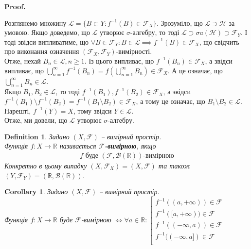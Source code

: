 \documentclass[a4paper, 10pt]{article}
\makeatletter
\theoremstyle{theoremdd}
\newtheorem{definition}[theorem]{Definition}
\newtheorem{corollary}[theorem]{Corollary}
\renewenvironment{proof}[1][Proof.\\]{\par
\pushQED{\hfill \qed}%
\normalfont \topsep6\p@\@plus6\p@\relax
\trivlist
\item\relax
{\bfseries
#1\@addpunct{.}}\hspace\labelsep\ignorespaces
}{%
\popQED\endtrivlist\@endpefalse
}
\makeatother
\begin{document}
\begin{proof}
Розглянемо множину $\mathcal{L} = \{ B \subset Y : f^{-1}(B) \in \mathcal{F}_X \}$. Зрозуміло, що $\mathcal{L} \supset \mathcal{H}$ за умовою. Якщо доведемо, що $\mathcal{L}$ утворює $\sigma$-алгебру, то тоді $\mathcal{L} \supset \sigma a(\mathcal{H}) \supset \mathcal{F}_Y$. І тоді звідси випливатиме, що $\forall B \in \mathcal{F}_Y: B \in \mathcal{L} \implies f^{-1}(B) \in \mathcal{F}_X$, що свідчить про виконання означення $(\mathcal{F}_X,\mathcal{F}_Y)$-вимірності.\\
Отже, нехай $B_n \in \mathcal{L}, n \geq 1$. Із цього випливає, що $f^{-1}(B_n) \in \mathcal{F}_X$, а звідси випливає, що $\displaystyle\bigcup_{n=1}^\infty f^{-1}(B_n) = f\left( \bigcup_{n=1}^\infty B_n \right) \in \mathcal{F}_X$. А це означає, що $\displaystyle\bigcup_{n=1}^\infty B_n \in \mathcal{L}$.\\
Якщо $B_1,B_2 \in \mathcal{L}$, то тоді $f^{-1}(B_1),f^{-1}(B_2) \in \mathcal{F}_X$, а звідси $f^{-1}(B_1) \setminus f^{-1}(B_2) = f^{-1}(B_1 \setminus B_2) \in \mathcal{F}_X$, а тому це означає, що $B_1 \setminus B_2 \in \mathcal{L}$.\\
Нарешті, $f^{-1}(Y) = X$, тому звідси $Y \in \mathcal{L}$.\\
Отже, ми довели, що $\mathcal{L}$ утворює $\sigma$-алгебру.
\end{proof}

\begin{definition}
Задано $(X,\mathcal{F})$ -- вимірний простір.\\
Функція $f \colon X \to \mathbb{R}$ називається \textbf{$\mathcal{F}$-вимірною}, якщо
\begin{align*}
f \text{ буде } (\mathcal{F},\mathcal{B}(\mathbb{R}))\text{-вимірною}
\end{align*}
Конкретно в цьому випадку $(X,\mathcal{F}_X) = (X,\mathcal{F})$ та також $(Y,\mathcal{F}_Y) = (\mathbb{R}, \mathcal{B}(\mathbb{R}))$.
\end{definition}

\begin{corollary}
Задано $(X,\mathcal{F})$ -- вимірний простір.\\
Функція $f \colon X \to \mathbb{R}$ буде $\mathcal{F}$-вимірною $\iff \forall a \in \mathbb{R}: \left[ \begin{gathered} f^{-1}((a,+\infty)) \in \mathcal{F} \\ f^{-1}([a,+\infty)) \in \mathcal{F} \\ f^{-1}((-\infty,a)) \in \mathcal{F} \\ f^{-1}((-\infty,a]) \in \mathcal{F} \\ \end{gathered} \right.$
\end{corollary}
\end{document}
